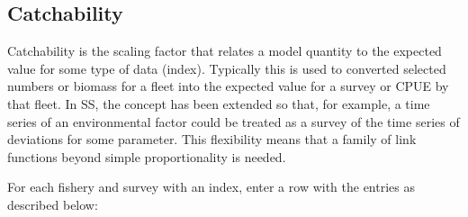 \subsection{Catchability}
Catchability is the scaling factor that relates a model quantity to the expected value for some type of data (index).  Typically this is used to converted selected numbers or biomass for a fleet into the expected value for a survey or CPUE by that fleet.  In SS, the concept has been extended so that, for example, a time series of an environmental factor could be treated as a survey of the time series of deviations for some parameter.  This flexibility means that a family of link functions beyond simple proportionality is needed.

For each fishery and survey with an index, enter a row with the entries as described below:

